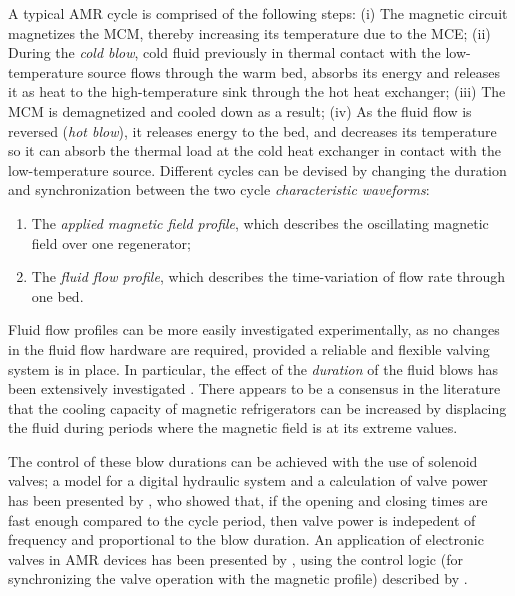 \documentclass[referee]{svjour3}
\begin{document}

A typical AMR cycle is comprised of the following steps: (i) The magnetic circuit magnetizes the MCM, thereby increasing its temperature due to the MCE; (ii) During the \emph{cold blow}, cold fluid previously in thermal contact with the low-temperature source flows through the warm bed, absorbs its energy and releases it as heat to the high-temperature sink through the hot heat exchanger; (iii) The MCM is demagnetized and cooled down as a result; (iv) As the fluid flow is reversed (\emph{hot blow}), it releases energy to the bed, and decreases its temperature so it can absorb the thermal load at the cold heat exchanger in contact with the low-temperature source. Different cycles can be devised by changing the duration and synchronization  between the two cycle \emph{characteristic waveforms}:

\begin{enumerate}
\item The \emph{applied magnetic field profile}, which describes the oscillating magnetic field over one regenerator;
\item The \emph{fluid flow profile}, which describes the time-variation of flow rate through one bed.
\end{enumerate}

Fluid flow profiles can be more easily investigated  experimentally, as no changes in the fluid flow hardware are required, provided a reliable and flexible valving system is in place. In particular, the effect of the \emph{duration} of the fluid blows has been extensively investigated \cite{bib:teyber17_exper,bib:nakashima18-influen-exp,FORTKAMP2018}. There appears to be a consensus in the literature that the cooling capacity of magnetic refrigerators can be increased by displacing the fluid during periods where the magnetic field is at its extreme values. 

The control of these blow durations can be achieved with the use of solenoid valves; a model for a digital hydraulic system and a calculation of valve power has been presented by  \cite{bib:cardoso16_trans}, who showed that, if the opening and closing times are fast enough compared to the cycle period, then valve power is indepedent of frequency and proportional to the blow duration.  An application of  electronic valves in AMR devices has been presented by \cite{bib:nakashima18-perfor-asses-solen-valves-flow}, using the control logic (for synchronizing the valve operation with the magnetic profile) described by \cite{bib:hoffmann17-actuat}.
\end{document}
